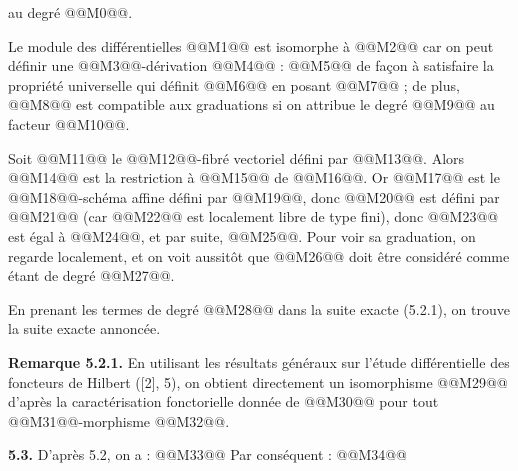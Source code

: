 
au degré @@M0@@.

Le module des différentielles @@M1@@ est isomorphe à @@M2@@ car on peut définir une @@M3@@-dérivation @@M4@@ :
@@M5@@
de façon à satisfaire la propriété universelle qui définit @@M6@@ en posant @@M7@@ ; de plus, @@M8@@ est compatible aux graduations si on attribue le degré @@M9@@ au facteur @@M10@@.

Soit @@M11@@ le @@M12@@-fibré vectoriel défini par @@M13@@. Alors @@M14@@ est la restriction à @@M15@@ de @@M16@@. Or @@M17@@ est le @@M18@@-schéma affine défini par @@M19@@, donc @@M20@@ est défini par @@M21@@ (car @@M22@@ est localement libre de type fini), donc @@M23@@ est égal à @@M24@@, et par suite, @@M25@@. Pour voir sa graduation, on regarde localement, et on voit aussitôt que @@M26@@ doit être considéré comme étant de degré @@M27@@.

En prenant les termes de degré @@M28@@ dans la suite exacte (5.2.1), on trouve la suite exacte annoncée.

\textbf{Remarque 5.2.1.} En utilisant les résultats généraux sur l'étude différentielle des foncteurs de Hilbert ([2], 5), on obtient directement un isomorphisme @@M29@@ d'après la caractérisation fonctorielle donnée de @@M30@@ pour tout @@M31@@-morphisme @@M32@@.

\textbf{5.3.} D'après 5.2, on a :
@@M33@@
Par conséquent :
@@M34@@

